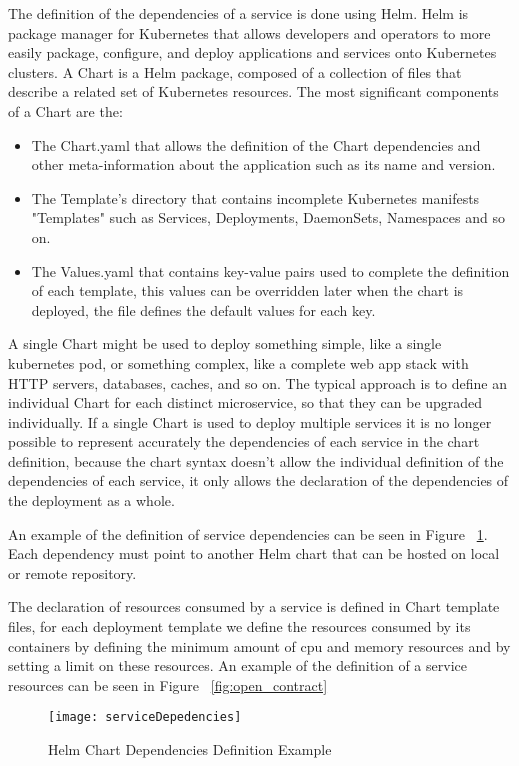 The definition of the dependencies of a service is done using Helm.
Helm is package manager for Kubernetes that allows developers and operators to more easily package, configure, and deploy applications and services onto Kubernetes clusters.
A Chart is a Helm package, composed of a collection of files that describe a related set of Kubernetes resources.
The most significant components of a Chart are the:
\begin{itemize}
    \item The Chart.yaml that allows the definition of the Chart dependencies and other meta-information about the application such as its name and version.
    \item The Template's directory that contains incomplete Kubernetes manifests "Templates" such as Services, Deployments, DaemonSets, Namespaces and so on.
    \item The Values.yaml that contains key-value pairs used to complete the definition of each template, this values can be overridden later when the chart is deployed, the file defines the default values for each key.
\end{itemize}
A single Chart might be used to deploy something simple, like a single kubernetes pod, or something complex, like a complete web app stack with HTTP servers, databases, caches, and so on.
The typical approach is to define an individual Chart for each distinct microservice, so that they can be upgraded individually.
If a single Chart is used to deploy multiple services it is no longer possible to represent accurately the dependencies of each service
in the chart definition, because the chart syntax doesn't allow the individual definition of the dependencies of each service, it only allows the declaration of the dependencies of the deployment as a whole.

An example of the definition of service dependencies can be seen in Figure ~\ref{fig:serviceDepedencies}.
Each dependency must point to another Helm chart that can be hosted on local or remote repository.

The declaration of resources consumed by a service is defined in Chart template files,
for each deployment template we define the resources consumed by its containers by
defining the minimum amount of cpu and memory resources and by setting a limit on these resources.
An example of the definition of a service resources can be seen in Figure ~\ref{fig:open_contract}

\begin{figure}[htbp]
    \centering
    \texttt{[image: serviceDepedencies]}
    \caption{Helm Chart Dependencies Definition Example}
    \label{fig:serviceDepedencies}
\end{figure}

